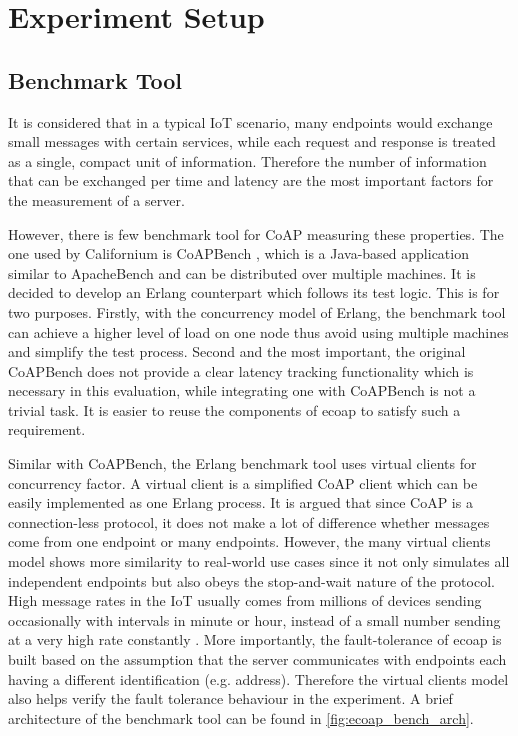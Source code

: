 \section{Experiment Setup}

\subsection{Benchmark Tool} \label{ecoap_bench}

It is considered that in a typical IoT scenario, many endpoints would exchange small messages with certain services, while each request and response is treated as a single, compact unit of information. Therefore the number of information that can be exchanged per time and latency are the most important factors for the measurement of a server.

However, there is few benchmark tool for CoAP measuring these properties. The one used by Californium is CoAPBench \autocite{coapbench}, which is a Java-based application similar to ApacheBench \autocite{apachebench} and can be distributed over multiple machines. It is decided to develop an Erlang counterpart which follows its test logic. This is for two purposes. Firstly, with the concurrency model of Erlang, the benchmark tool can achieve a higher level of load on one node thus avoid using multiple machines and simplify the test process. Second and the most important, the original CoAPBench does not provide a clear latency tracking functionality which is necessary in this evaluation, while integrating one with CoAPBench is not a trivial task. It is easier to reuse the components of ecoap to satisfy such a requirement. 

Similar with CoAPBench, the Erlang benchmark tool uses virtual clients for concurrency factor. A virtual client is a simplified CoAP client which can be easily implemented as one Erlang process. It is argued that since CoAP is a connection-less protocol, it does not make a lot of difference whether messages come from one endpoint or many endpoints. However, the many virtual clients model shows more similarity to real-world use cases since it not only simulates all independent endpoints but also obeys the stop-and-wait nature of the protocol. High message rates in the IoT usually comes from millions of devices sending occasionally with intervals in minute or hour, instead of a small number sending at a very high rate constantly \autocite{kovatsch2015scalable}. More importantly, the fault-tolerance of ecoap is built based on the assumption that the server communicates with endpoints each having a different identification (e.g. address). Therefore the virtual clients model also helps verify the fault tolerance behaviour in the experiment. A brief architecture of the benchmark tool can be found in \autoref{fig:ecoap_bench_arch}.

